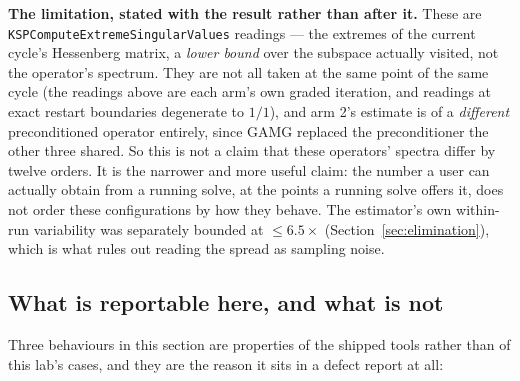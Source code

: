 \documentclass[11pt,a4paper]{article}
\begin{document}
\textbf{The limitation, stated with the result rather than after it.} These are
\texttt{KSPComputeExtremeSingularValues} readings --- the extremes of the current cycle's
Hessenberg matrix, a \emph{lower bound} over the subspace actually visited, not the operator's
spectrum. They are not all taken at the same point of the same cycle (the readings above are each
arm's own graded iteration, and readings at exact restart boundaries degenerate to \(1/1\)), and
arm 2's estimate is of a \emph{different} preconditioned operator entirely, since GAMG replaced
the preconditioner the other three shared. So this is not a claim that these operators' spectra
differ by twelve orders. It is the narrower and more useful claim: the number a user can actually
obtain from a running solve, at the points a running solve offers it, does not order these
configurations by how they behave. The estimator's own within-run variability was separately
bounded at \(\le6.5\times\) (Section~\ref{sec:elimination}), which is what rules out reading the
spread as sampling noise.

\subsection{What is reportable here, and what is not}

Three behaviours in this section are properties of the shipped tools rather than of this
lab's cases, and they are the reason it sits in a defect report at all:
\end{document}

